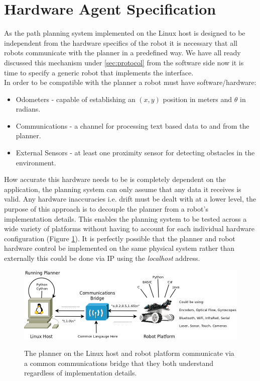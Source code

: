 
\section{Hardware Agent Specification}
\noindent
As the path planning system implemented on the Linux host is designed to be independent from the hardware specifics of the robot it is necessary that all robots communicate with the planner in a predefined way. We have all ready discussed this mechanism under \ref{sec:protocol} from the software side now it is time to specify a generic robot that implements the interface. \\

\noindent
In order to be compatible with the planner a robot must have software/hardware:

\begin{itemize}
\item Odometers - capable of establishing an $(x, y)$ position in meters and $\theta$ in radians.
\item Communications - a channel for processing text based data to and from the planner.
\item External Sensors - at least one proximity sensor for detecting obstacles in the environment.
\end{itemize}

\newpage

\noindent
How accurate this hardware needs to be is completely dependent on the application, the planning system can only assume that any data it receives is valid. Any hardware inaccuracies i.e. drift must be dealt with at a lower level, the purpose of this approach is to decouple the planner from a robot's implementation details. This enables the planning system to be tested across a wide variety of platforms without having to account for each individual hardware configuration (Figure \ref{Figure: Hardware Agent Specification.}). It is perfectly possible that the planner and robot hardware control be implemented on the same physical system rather than externally this could be done via IP using the \textit{localhost} address.

\begin{figure}[htbp]

\center \includegraphics[width=400pt]{illustrations/hardware_agent_specification}\\
\caption{The planner on the Linux host and robot platform communicate via a common communications bridge that they both understand regardless of implementation details.} 
\label{Figure: Hardware Agent Specification.}

\end{figure}

